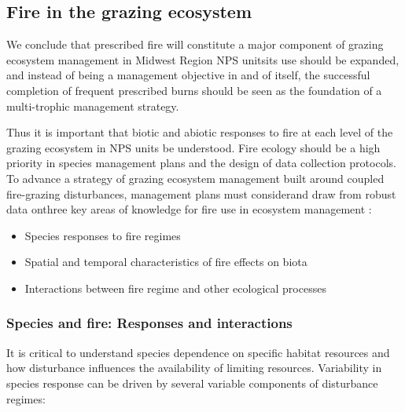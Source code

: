 \subsection{Fire in the grazing ecosystem}

We conclude that prescribed fire will constitute a major component of grazing ecosystem management in Midwest Region NPS units\textemdash its use should be expanded, and instead of being a management objective in and of itself, the successful completion of frequent prescribed burns should be seen as the foundation of a multi-trophic management strategy. 

Thus it is important that biotic and abiotic responses to fire at each level of the grazing ecosystem in NPS units be understood. 
Fire ecology should be a high priority in species management plans and the design of data collection protocols. 
To advance a strategy of grazing ecosystem management built around coupled fire-grazing disturbances, management plans must consider\textemdash and draw from robust data on\textemdash three key areas of knowledge for fire use in ecosystem management \citep{driscoll2010}: 

\begin{itemize}
	\item Species responses to fire regimes
	\item Spatial and temporal characteristics of fire effects on biota
	\item Interactions between fire regime and other ecological processes
\end{itemize}

\subsubsection{Species and fire: Responses and interactions}

It is critical to understand species dependence on specific habitat resources and how disturbance influences the availability of limiting resources. 
Variability in species response can be driven by several variable components of disturbance regimes: 

